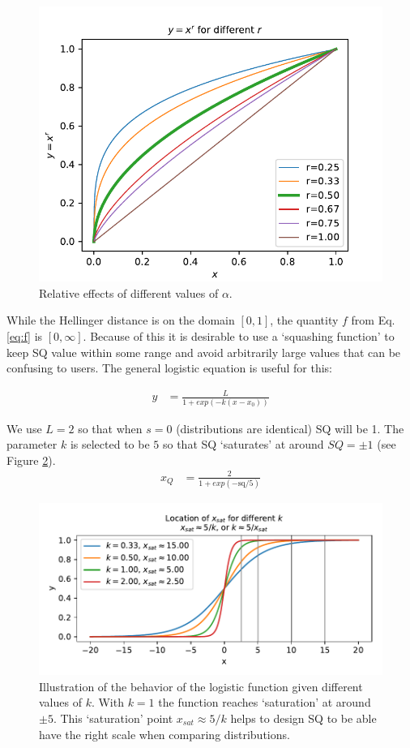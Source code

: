 \begin{figure}[tbp]
    \centering
    \includegraphics[width=0.9\linewidth]{Figures/power_comparison}
    \caption{Relative effects of different values of $\alpha$.}
    \label{fig:alphas}
\end{figure}

While the Hellinger distance is on the domain $[0,1]$, the quantity $f$ from Eq. \ref{eq:f} is $[0,\infty]$. Because of this it is desirable to use a `squashing function' to keep SQ value within some range and avoid arbitrarily large values that can be confusing to users. The general logistic equation is useful for this:

\begin{align}
    y &= \frac{L}{1+exp(-k(x-x_0))} \label{eq:get_log}
\end{align}

We use $L=2$ so that when $s=0$ (distributions are identical) SQ will be 1. The parameter $k$ is selected to be $5$ so that SQ `saturates' at around $SQ=\pm1$ (see Figure \ref{fig:log_sat}).
\begin{align}
    x_{Q} &= \frac{2}{1+exp(-\text{sq}/5)}\label{eq:SQ}
\end{align}
\begin{figure}[tbp]
    \centering
    \includegraphics[width=0.9\linewidth]{Figures/logistic_saturation}
    \caption{Illustration of the behavior of the logistic function given different values of $k$. With $k=1$ the function reaches `saturation' at around $\pm5$. This `saturation' point $x_{sat}\approx 5/k$ helps to design SQ to be able have the right scale when comparing distributions.}
    \label{fig:log_sat}
\end{figure}

